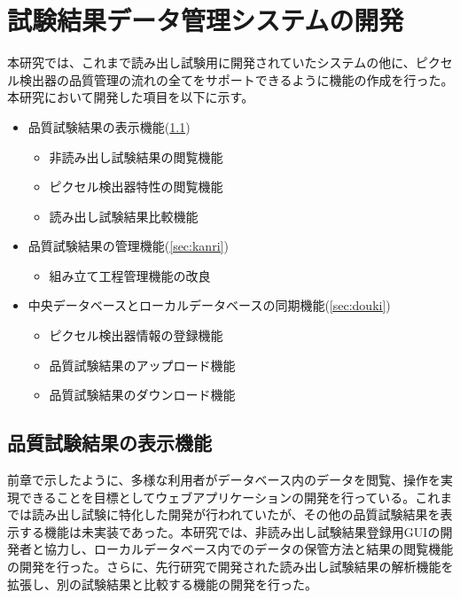 \chapter{試験結果データ管理システムの開発}
\label{sec:chap7}

本研究では、これまで読み出し試験用に開発されていたシステムの他に、ピクセル検出器の品質管理の流れの全てをサポートできるように機能の作成を行った。本研究において開発した項目を以下に示す。
\begin{itemize}
  \item[1.] 品質試験結果の表示機能(\ref{sec:hyouji})
  \begin{itemize}
    \item 非読み出し試験結果の閲覧機能
    \item ピクセル検出器特性の閲覧機能
    \item 読み出し試験結果比較機能
  \end{itemize}
  \item[2.] 品質試験結果の管理機能(\ref{sec:kanri})
  \begin{itemize}
    \item 組み立て工程管理機能の改良
  \end{itemize}
  \item[3.] 中央データベースとローカルデータベースの同期機能(\ref{sec:douki})
  \begin{itemize}
    \item ピクセル検出器情報の登録機能
    \item 品質試験結果のアップロード機能
    \item 品質試験結果のダウンロード機能
  \end{itemize}
\end{itemize}

\section{品質試験結果の表示機能}
\label{sec:hyouji}

前章で示したように、多様な利用者がデータベース内のデータを閲覧、操作を実現できることを目標としてウェブアプリケーションの開発を行っている。これまでは読み出し試験に特化した開発が行われていたが、その他の品質試験結果を表示する機能は未実装であった。本研究では、非読み出し試験結果登録用GUIの開発者と協力し、ローカルデータベース内でのデータの保管方法と結果の閲覧機能の開発を行った。さらに、先行研究で開発された読み出し試験結果の解析機能を拡張し、別の試験結果と比較する機能の開発を行った。

